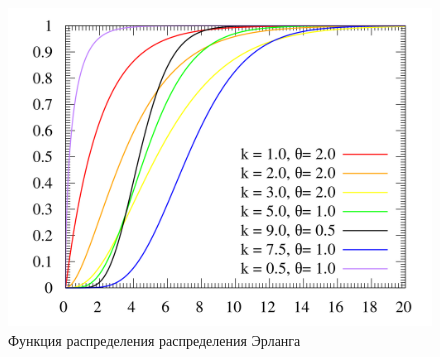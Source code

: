 \begin{figure}[H]
    \begin{center}
    \includegraphics[width=0.5\linewidth]{inc/erlang_Fx.png}
    \caption{Функция распределения распределения Эрланга}
    \label{fig:}
    \end{center}
\end{figure}